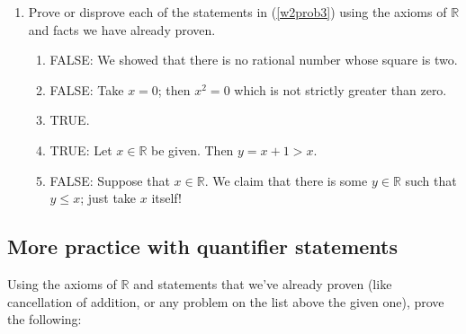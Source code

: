 \documentclass[12pt]{amsart}
\newcommand{\R}{{\mathbb{R}}}
\numberwithin{equation}{section}
\theoremstyle{plain} %
\theoremstyle{definition}
\theoremstyle{remark}
\begin{document}
\begin{enumerate}
\

\item Prove or disprove each of the statements in (\ref{w2prob3}) using the axioms of $\R$ and facts we have already proven.


\begin{framed}
\begin{enumerate}
\item  FALSE: We showed that there is no rational number whose square is two.
\item FALSE: Take $x=0$; then $x^2=0$ which is not strictly greater than zero.
\item TRUE.
\item TRUE: Let $x\in \R$ be given. Then $y=x+1 > x$.
\item FALSE: Suppose that $x\in \R$. We claim that there is some $y\in \R$ such that $y\leq x$; just take $x$ itself!
\end{enumerate}
\end{framed}


\end{enumerate}

\subsection*{More practice with quantifier statements} Using the axioms of $\R$ and statements that we've already proven (like cancellation of addition, or any problem on the list above the given one), prove the following:
\end{document}

